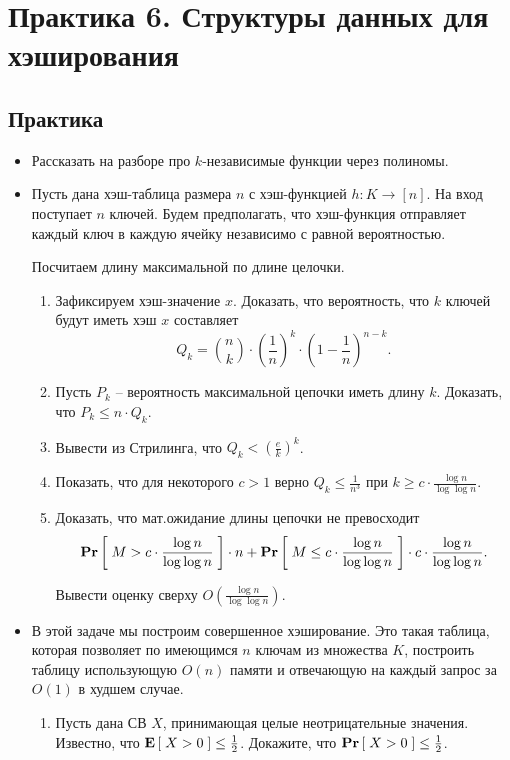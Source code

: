 \section{Практика 6. Структуры данных для хэширования}

\subsection{Практика}

\begin{itemize}
  \item Рассказать на разборе про $k$-независимые функции через полиномы.
  
  \item Пусть дана хэш-таблица размера $n$ с хэш-функцией $h : K \rightarrow [n]$. На вход поступает $n$ ключей. Будем предполагать, что хэш-функция отправляет каждый ключ в каждую ячейку независимо с равной вероятностью.
      
      Посчитаем длину максимальной по длине целочки.
      \begin{enumerate}
          \item Зафиксируем хэш-значение $x$. Доказать, что вероятность, что $k$ ключей будут иметь хэш $x$ составляет
          $$
              Q_k = \binom{n}{k} \cdot \left( \frac{1}{n} \right)^k \cdot  \left( 1 - \frac{1}{n} \right)^{n - k}.
          $$
          \item Пусть $P_k$ -- вероятность максимальной цепочки иметь длину $k$. Доказать, что $P_k \leq n \cdot Q_k$.
          \item Вывести из Стрилинга, что $Q_k < (\frac{e}{k})^k$.
          \item Показать, что для некоторого $c > 1$ верно $Q_k \leq \frac{1}{n^3}$ при 
          $k \geq c \cdot \frac{\log n}{\log \log n}$.
          \item Доказать, что мат.ожидание длины цепочки не превосходит
          $$
              \underset{}{\textbf{Pr}}\left[ \;  M > c \cdot \frac{\log n}{\log \log n}  \;\right] \cdot n + \underset{}{\textbf{Pr}}\left[ \;  M \leq c \cdot \frac{\log n}{\log \log n}  \;\right] \cdot c \cdot \frac{\log n}{\log \log n}.
          $$
          
          Вывести оценку сверху $O(\frac{\log n}{\log \log n})$.
      \end{enumerate}
  
  \item В этой задаче мы построим совершенное хэширование. Это такая таблица, 
  которая позволяет по имеющимся $n$ ключам из множества $K$, построить таблицу
  использующую $O(n)$ памяти и отвечающую на каждый запрос за $O(1)$ в худшем 
  случае.
  \begin{enumerate}
    \item Пусть дана СВ $X$, принимающая целые неотрицательные значения. 
      Известно, что $\underset{}{\textbf{E}}\left[ \;  X > 0  \;\right] \leq \frac{1}{2}$. Докажите, что
      $\underset{}{\textbf{Pr}}\left[ \; X > 0 \;\right] \leq \frac{1}{2}$.


\end{enumerate}
\end{itemize}
